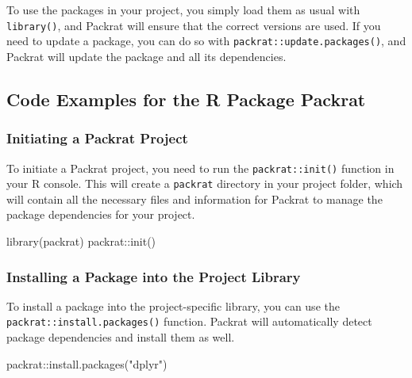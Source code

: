 \documentclass[
]{book}
\newenvironment{Shaded}{\begin{snugshade}}{\end{snugshade}}
\newcommand{\FunctionTok}[1]{\textcolor[rgb]{0.00,0.00,0.00}{#1}}
\newcommand{\NormalTok}[1]{#1}
\newcommand{\SpecialCharTok}[1]{\textcolor[rgb]{0.00,0.00,0.00}{#1}}
\newcommand{\StringTok}[1]{\textcolor[rgb]{0.31,0.60,0.02}{#1}}
\begin{document}
To use the packages in your project, you simply load them as usual with \texttt{library()}, and Packrat will ensure that the correct versions are used. If you need to update a package, you can do so with \texttt{packrat::update.packages()}, and Packrat will update the package and all its dependencies.

\hypertarget{code-examples-for-the-r-package-packrat}{%
\subsection{Code Examples for the R Package Packrat}\label{code-examples-for-the-r-package-packrat}}

\hypertarget{initiating-a-packrat-project}{%
\subsubsection{Initiating a Packrat Project}\label{initiating-a-packrat-project}}

To initiate a Packrat project, you need to run the \texttt{packrat::init()} function in your R console. This will create a \texttt{packrat} directory in your project folder, which will contain all the necessary files and information for Packrat to manage the package dependencies for your project.

\begin{Shaded}
\begin{Highlighting}[]
\FunctionTok{library}\NormalTok{(packrat)}
\NormalTok{packrat}\SpecialCharTok{::}\FunctionTok{init}\NormalTok{()}
\end{Highlighting}
\end{Shaded}

\hypertarget{installing-a-package-into-the-project-library}{%
\subsubsection{Installing a Package into the Project Library}\label{installing-a-package-into-the-project-library}}

To install a package into the project-specific library, you can use the \texttt{packrat::install.packages()} function. Packrat will automatically detect package dependencies and install them as well.

\begin{Shaded}
\begin{Highlighting}[]
\NormalTok{packrat}\SpecialCharTok{::}\FunctionTok{install.packages}\NormalTok{(}\StringTok{"dplyr"}\NormalTok{)}
\end{Highlighting}
\end{Shaded}
\end{document}
